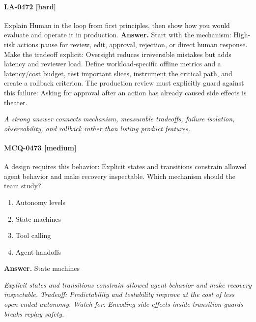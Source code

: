 \paragraph{LA-0472 [hard]} Explain Human in the loop from first principles, then show how you would evaluate and operate it in production.
\noindent\textbf{Answer.} Start with the mechanism: High-risk actions pause for review, edit, approval, rejection, or direct human response. Make the tradeoff explicit: Oversight reduces irreversible mistakes but adds latency and reviewer load. Define workload-specific offline metrics and a latency/cost budget, test important slices, instrument the critical path, and create a rollback criterion. The production review must explicitly guard against this failure: Asking for approval after an action has already caused side effects is theater.
\par\textit{A strong answer connects mechanism, measurable tradeoffs, failure isolation, observability, and rollback rather than listing product features.}
\paragraph{MCQ-0473 [medium]} A design requires this behavior: Explicit states and transitions constrain allowed agent behavior and make recovery inspectable. Which mechanism should the team study?
\begin{enumerate}[label=\Alph*.]
\item Autonomy levels
\item State machines
\item Tool calling
\item Agent handoffs
\end{enumerate}
\noindent\textbf{Answer.} State machines
\par\textit{Explicit states and transitions constrain allowed agent behavior and make recovery inspectable. Tradeoff: Predictability and testability improve at the cost of less open-ended autonomy. Watch for: Encoding side effects inside transition guards breaks replay safety.}
